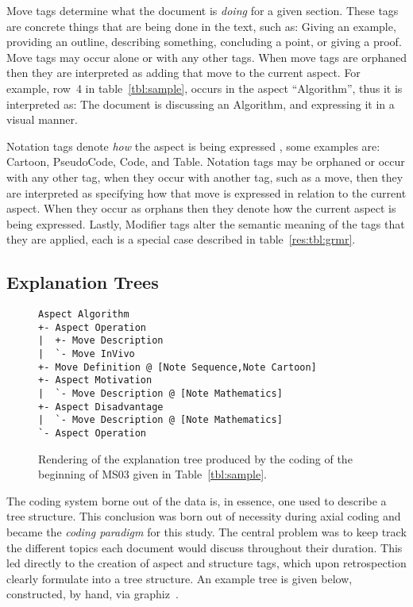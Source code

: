 \documentclass[sigconf]{acmart}
\begin{document}
Move tags determine what the document is \emph{doing} for a given section.
These tags are concrete things that are being done in the text, such as: Giving
an example, providing an outline, describing something, concluding a point, or
giving a proof. Move tags may occur alone or with any other tags. When move
tags are orphaned then they are interpreted as adding that move to the current
aspect. For example, row~4 in table~\ref{tbl:sample}, occurs in the
aspect ``Algorithm'', thus it is interpreted as: The document is discussing
an Algorithm, and expressing it in a visual manner.

Notation tags denote \emph{how} the aspect is being expressed , some examples
are: Cartoon, PseudoCode, Code, and Table. Notation tags may be orphaned or
occur with any other tag, when they occur with another tag, such as a move, then
they are interpreted as specifying how that move is expressed in relation to the
current aspect. When they occur as orphans then they denote how the current
aspect is being expressed. Lastly, Modifier tags alter the semantic meaning of
the tags that they are applied, each is a special case described in
table~\ref{res:tbl:grmr}.
%

\subsection{Explanation Trees}
\label{sec:res:xopTree}

% 

\begin{figure}
\begin{Verbatim}[fontsize=\small,xleftmargin=2ex]
Aspect Algorithm
+- Aspect Operation
|  +- Move Description
|  `- Move InVivo
+- Move Definition @ [Note Sequence,Note Cartoon]
+- Aspect Motivation
|  `- Move Description @ [Note Mathematics]
+- Aspect Disadvantage
|  `- Move Description @ [Note Mathematics]
`- Aspect Operation
\end{Verbatim}
\caption{Rendering of the explanation tree produced by the coding of the
beginning of MS03 given in Table~\ref{tbl:sample}.}
\label{fig:tree}
\end{figure}

The coding system borne out of the data is, in essence, one used to describe a
tree structure. This conclusion was born out of necessity during axial coding
and became the \emph{coding paradigm} for this study. The central problem was to
keep track the different topics each document would discuss throughout their
duration. This led directly to the creation of aspect and structure tags, which
upon retrospection clearly formulate into a tree structure. An
example tree is given below, constructed, by hand, via
graphiz~\cite{Ellson2002}.
\end{document}
